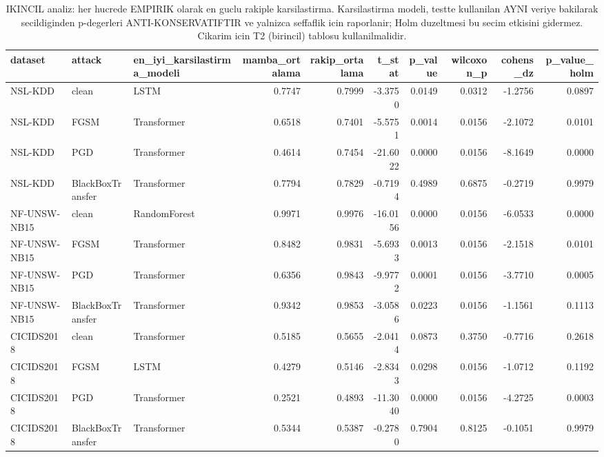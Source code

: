\begin{table}[ht]
\centering
\caption{IKINCIL analiz: her hucrede EMPIRIK olarak en guclu rakiple karsilastirma. Karsilastirma modeli, testte kullanilan AYNI veriye bakilarak secildiginden p-degerleri ANTI-KONSERVATIFTIR ve yalnizca seffaflik icin raporlanir; Holm duzeltmesi bu secim etkisini gidermez. Cikarim icin T2 (birincil) tablosu kullanilmalidir.}
\label{tab:T2b_istatistiksel_anlamlilik_posthoc}
\begin{tabular}{lllrrrrrrr}
\toprule
dataset & attack & en\_iyi\_karsilastirma\_modeli & mamba\_ortalama & rakip\_ortalama & t\_stat & p\_value & wilcoxon\_p & cohens\_dz & p\_value\_holm \\
\midrule
NSL-KDD & clean & LSTM & 0.7747 & 0.7999 & -3.3750 & 0.0149 & 0.0312 & -1.2756 & 0.0897 \\
NSL-KDD & FGSM & Transformer & 0.6518 & 0.7401 & -5.5751 & 0.0014 & 0.0156 & -2.1072 & 0.0101 \\
NSL-KDD & PGD & Transformer & 0.4614 & 0.7454 & -21.6022 & 0.0000 & 0.0156 & -8.1649 & 0.0000 \\
NSL-KDD & BlackBoxTransfer & Transformer & 0.7794 & 0.7829 & -0.7194 & 0.4989 & 0.6875 & -0.2719 & 0.9979 \\
NF-UNSW-NB15 & clean & RandomForest & 0.9971 & 0.9976 & -16.0156 & 0.0000 & 0.0156 & -6.0533 & 0.0000 \\
NF-UNSW-NB15 & FGSM & Transformer & 0.8482 & 0.9831 & -5.6933 & 0.0013 & 0.0156 & -2.1518 & 0.0101 \\
NF-UNSW-NB15 & PGD & Transformer & 0.6356 & 0.9843 & -9.9772 & 0.0001 & 0.0156 & -3.7710 & 0.0005 \\
NF-UNSW-NB15 & BlackBoxTransfer & Transformer & 0.9342 & 0.9853 & -3.0586 & 0.0223 & 0.0156 & -1.1561 & 0.1113 \\
CICIDS2018 & clean & Transformer & 0.5185 & 0.5655 & -2.0414 & 0.0873 & 0.3750 & -0.7716 & 0.2618 \\
CICIDS2018 & FGSM & LSTM & 0.4279 & 0.5146 & -2.8343 & 0.0298 & 0.0156 & -1.0712 & 0.1192 \\
CICIDS2018 & PGD & Transformer & 0.2521 & 0.4893 & -11.3040 & 0.0000 & 0.0156 & -4.2725 & 0.0003 \\
CICIDS2018 & BlackBoxTransfer & Transformer & 0.5344 & 0.5387 & -0.2780 & 0.7904 & 0.8125 & -0.1051 & 0.9979 \\
\bottomrule
\end{tabular}

\end{table}
